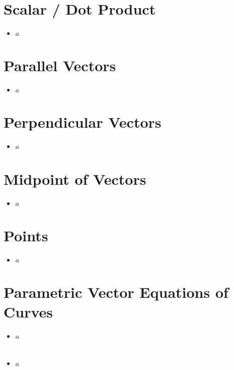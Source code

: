 \documentclass{report}
\begin{document}
        \section{Scalar / Dot Product}
            \begin{itemize}
                \item $a$
            \end{itemize}
        \section{Parallel Vectors}
            \begin{itemize}
                \item $a$
            \end{itemize}
        \section{Perpendicular Vectors}
            \begin{itemize}
                \item $a$
            \end{itemize}
        \section{Midpoint of Vectors}
            \begin{itemize}
                \item $a$
            \end{itemize}
        \section{Points}
            \begin{itemize}
                \item $a$
            \end{itemize}
        \section{Parametric Vector Equations of Curves}
            \begin{itemize}
                \item $a$
            \end{itemize}
        \section{}
            \begin{itemize}
                \item $a$
            \end{itemize}
\end{document}
